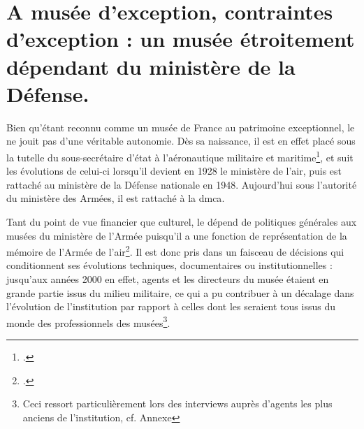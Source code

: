 \section{\label{I-B-1}A musée d’exception, contraintes d’exception : un musée étroitement dépendant du ministère de la Défense. }

Bien qu'étant reconnu comme un musée de France au patrimoine exceptionnel, le \mae ne jouit pas d'une véritable autonomie. Dès sa naissance, il est en effet placé sous la tutelle du sous-secrétaire d'état à l'aéronautique militaire et maritime\footcite{terrierAeroportParisBourget2019}, et suit les évolutions de celui-ci lorsqu'il devient en 1928 le ministère de l'air, puis est rattaché au ministère de la Défense nationale en 1948. Aujourd'hui sous l'autorité du ministère des Armées, il est rattaché à la \gls{dmca}.


Tant du point de vue financier que culturel, le \mae dépend de politiques générales aux musées du ministère de l'Armée puisqu'il a une fonction de représentation de la mémoire de l'Armée de l'air\footcite{museedelairetdelespaceProjetScientifiqueCulturel2020}. Il est donc pris dans un faisceau de décisions qui conditionnent ses évolutions techniques, documentaires ou institutionnelles : jusqu'aux années 2000 en effet, agents et les directeurs du musée étaient en grande partie issus du milieu militaire, ce qui a pu contribuer à un décalage dans l'évolution de l'institution  par rapport à celles dont les seraient tous issus du monde des professionnels des musées\footnote{Ceci ressort particulièrement lors des interviews auprès d'agents les plus anciens de l'institution, cf. Annexe}.


